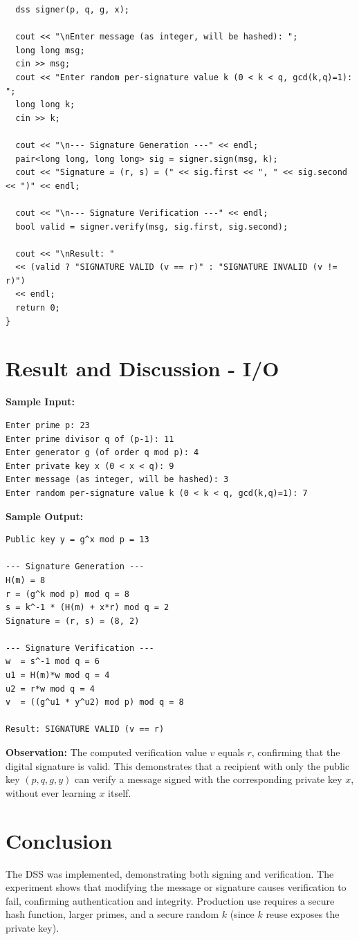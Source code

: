 \begin{verbatim}
  dss signer(p, q, g, x);

  cout << "\nEnter message (as integer, will be hashed): ";
  long long msg;
  cin >> msg;
  cout << "Enter random per-signature value k (0 < k < q, gcd(k,q)=1): ";
  long long k;
  cin >> k;

  cout << "\n--- Signature Generation ---" << endl;
  pair<long long, long long> sig = signer.sign(msg, k);
  cout << "Signature = (r, s) = (" << sig.first << ", " << sig.second << ")" << endl;

  cout << "\n--- Signature Verification ---" << endl;
  bool valid = signer.verify(msg, sig.first, sig.second);

  cout << "\nResult: "
  << (valid ? "SIGNATURE VALID (v == r)" : "SIGNATURE INVALID (v != r)")
  << endl;
  return 0;
}
\end{verbatim}

\section{Result and Discussion - I/O}
\textbf{Sample Input:}
\begin{verbatim}
Enter prime p: 23
Enter prime divisor q of (p-1): 11
Enter generator g (of order q mod p): 4
Enter private key x (0 < x < q): 9
Enter message (as integer, will be hashed): 3
Enter random per-signature value k (0 < k < q, gcd(k,q)=1): 7
\end{verbatim}

\textbf{Sample Output:}
\begin{verbatim}
Public key y = g^x mod p = 13

--- Signature Generation ---
H(m) = 8
r = (g^k mod p) mod q = 8
s = k^-1 * (H(m) + x*r) mod q = 2
Signature = (r, s) = (8, 2)

--- Signature Verification ---
w  = s^-1 mod q = 6
u1 = H(m)*w mod q = 4
u2 = r*w mod q = 4
v  = ((g^u1 * y^u2) mod p) mod q = 8

Result: SIGNATURE VALID (v == r)
\end{verbatim}

\textbf{Observation:} The computed verification value $v$ equals $r$,
confirming that the digital signature is valid. This demonstrates that a
recipient with only the public key $(p, q, g, y)$ can verify a message
signed with the corresponding private key $x$, without ever learning $x$
itself.

\section{Conclusion}
The DSS was implemented, demonstrating both signing and verification. The
experiment shows that modifying the message or signature causes verification
to fail, confirming authentication and integrity. Production use requires a
secure hash function, larger primes, and a secure random $k$ (since $k$
reuse exposes the private key).
